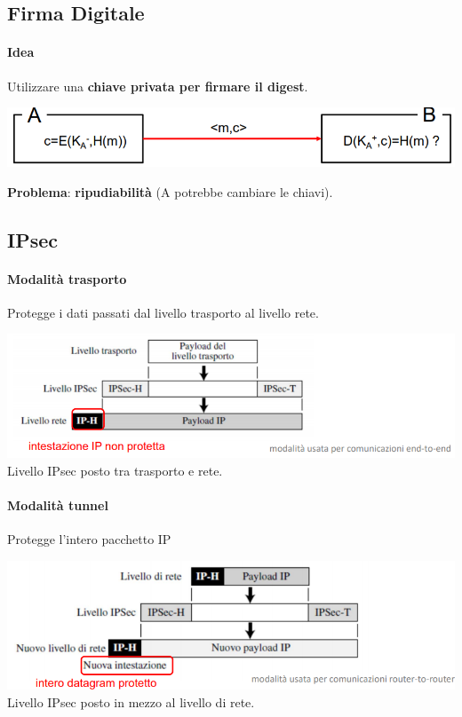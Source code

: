\documentclass[10pt]{article}
\begin{document}
{\subsection{Firma Digitale}
\paragraph{Idea} Utilizzare una \textbf{chiave privata per firmare il digest}.
\begin{center}
\includegraphics[scale=0.7]{firamdigitale.png}
\end{center}
\textbf{Problema}: \textbf{ripudiabilità} (A potrebbe cambiare le chiavi).
\subsection{IPsec}
\paragraph{Modalità trasporto} Protegge i dati passati dal livello trasporto al livello rete.
\begin{center}
\includegraphics[scale=0.7]{ipsectrasporto.png}\\
Livello IPsec posto tra trasporto e rete.
\end{center}
\paragraph{Modalità tunnel} Protegge l'intero pacchetto IP
\begin{center}
\includegraphics[scale=0.7]{ipsecrouter.png}\\
Livello IPsec posto in mezzo al livello di rete.
\end{center}
\pagebreak
}
\end{document}

